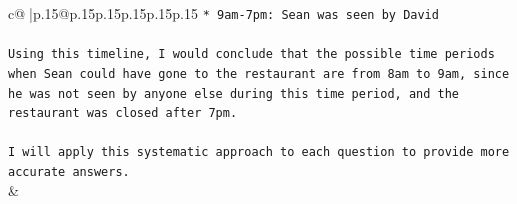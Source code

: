 \documentclass{article}
\begin{document}
{\begin{supertabular}{c@{$\;$}|p{.15\linewidth}@{}p{.15\linewidth}p{.15\linewidth}p{.15\linewidth}p{.15\linewidth}p{.15\linewidth}}
{{{\texttt{* 9am{-}7pm: Sean was seen by David} \\
\\ 
\texttt{Using this timeline, I would conclude that the possible time periods when Sean could have gone to the restaurant are from 8am to 9am, since he was not seen by anyone else during this time period, and the restaurant was closed after 7pm.} \\
\\ 
\texttt{I will apply this systematic approach to each question to provide more accurate answers.} \\
            }
        }
    }
    & \\ \\

\end{supertabular}
}
\end{document}

